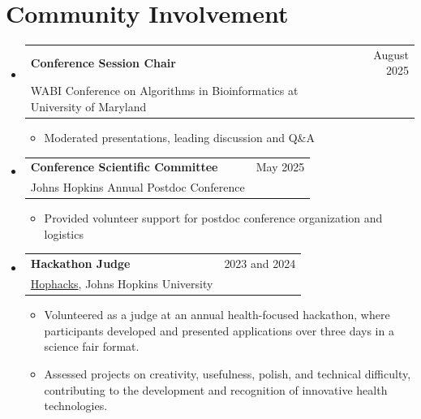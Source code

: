 \documentclass[A4,11pt]{article}
\makeatletter
\newcommand{\CVItem}[1]{
  \item\small{
    {#1 \vspace{-2pt}}
  }
}
\newcommand{\CVSubheading}[4]{
  \vspace{-2pt}\item
    \begin{tabular*}{0.97\textwidth}[t]{l@{\extracolsep{\fill}}r}
      \textbf{#1} & #2 \\
      \small#3 & \small #4 \\
    \end{tabular*}\vspace{-7pt}
}
\newcommand{\CVSubHeadingListStart}{\begin{itemize}[leftmargin=0.5cm, label={}]}
\newcommand{\CVSubHeadingListEnd}{\end{itemize}}
\newcommand{\CVItemListStart}{\begin{itemize}}
\newcommand{\CVItemListEnd}{\end{itemize}\vspace{-5pt}}
\makeatother
\begin{document}

    
  \section{Community Involvement}
  \CVSubHeadingListStart
  \CVSubheading
  {Conference Session Chair} {August 2025}
  {WABI Conference on Algorithms in Bioinformatics at University of Maryland}{}
  \CVItemListStart
  \CVItem{Moderated presentations, leading discussion and \textsc{Q\&A}}
  \CVItemListEnd
  \CVSubheading
  {Conference Scientific Committee} {May 2025}
  {Johns Hopkins Annual Postdoc Conference}{}
  \CVItemListStart
  \CVItem{Provided volunteer support for postdoc conference organization and logistics}
  \CVItemListEnd
  \CVSubheading
  {Hackathon Judge} {2023 and 2024}
  {\href{https://www.hophacks.com/}{Hophacks}, Johns Hopkins University}{}
  \CVItemListStart
  \CVItem{Volunteered as a judge at an annual health-focused hackathon, where participants developed and presented applications over three days in a science fair format.}
  \CVItem{Assessed projects on creativity, usefulness, polish, and technical difficulty, contributing to the development and recognition of innovative health technologies.}
  \CVItemListEnd
  \CVSubHeadingListEnd
\end{document}
